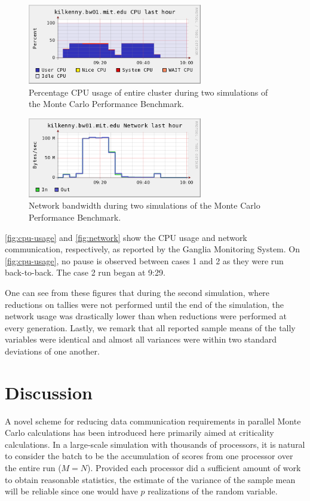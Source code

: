 \begin{figure}[ht]
  \centering
  \includegraphics[width=3in]{figures/ch4/cpu_usage.png}
  \caption{Percentage CPU usage of entire cluster during two simulations of the
    Monte Carlo Performance Benchmark.}
  \label{fig:cpu-usage}
\end{figure}
\begin{figure}[ht]
  \centering
  \includegraphics[width=3in]{figures/ch4/network.png}
  \caption{Network bandwidth during two simulations of the Monte Carlo
    Performance Benchmark.}
  \label{fig:network}
\end{figure}
\autoref{fig:cpu-usage} and \autoref{fig:network} show the CPU usage and network
communication, respectively, as reported by the Ganglia Monitoring System. On
\autoref{fig:cpu-usage}, no pause is observed between cases 1 and 2 as they were
run back-to-back. The case 2 run began at 9:29.

One can see from these figures that during the second simulation, where
reductions on tallies were not performed until the end of the simulation, the
network usage was drastically lower than when reductions were performed at every
generation. Lastly, we remark that all reported sample means of the tally
variables were identical and almost all variances were within two standard
deviations of one another.

\section{Discussion}

A novel scheme for reducing data communication requirements in parallel Monte
Carlo calculations has been introduced here primarily aimed at criticality
calculations. In a large-scale simulation with thousands of processors, it is
natural to consider the batch to be the accumulation of scores from one
processor over the entire run ($M = N$). Provided each processor did a
sufficient amount of work to obtain reasonable statistics, the estimate of the
variance of the sample mean will be reliable since one would have $p$
realizations of the random variable.

